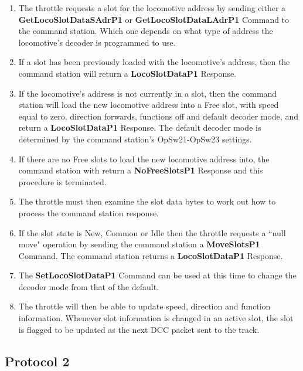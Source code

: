 \begin{enumerate}
\item The throttle requests a slot for the locomotive \gls{address} by sending either a \textbf{GetLocoSlotDataSAdrP1} or \textbf{GetLocoSlotDataLAdrP1} \gls{Command} to the command station. Which one depends on what type of address the locomotive's decoder is programmed to use. 
\item If a slot has been previously loaded with the locomotive's address, then the command station will return a \textbf{LocoSlotDataP1} \gls{Response}.
\item If the locomotive's address is not currently in a slot, then the command station will load the new locomotive address into a Free slot, with speed equal to zero, direction forwards, functions off and default decoder mode, and return a \textbf{LocoSlotDataP1} \gls{Response}. The default decoder mode is determined by the command station's OpSw21-OpSw23 settings.
\item If there are no Free slots to load the new locomotive address into, the command station with return a \textbf{NoFreeSlotsP1} \gls{Response} and this procedure is terminated.
\item The throttle must then examine the slot data bytes to work out how to process the command station response.
\item If the slot state is New, Common or Idle then the throttle requests a ``null move" operation by sending the command station a \textbf{MoveSlotsP1} \gls{Command}. The command station returns a \textbf{LocoSlotDataP1} \gls{Response}. 
\item The \textbf{SetLocoSlotDataP1} \gls{Command} can be used at this time to change the decoder mode from that of the default.
\item The throttle will then be able to update speed, direction and function information. Whenever slot information is changed in an active slot, the slot is flagged to be updated as the next DCC packet sent to the track. 
\end{enumerate}

\subsection{Protocol 2}

